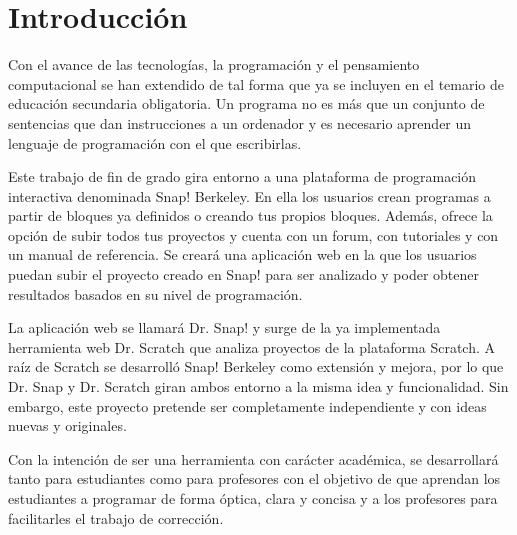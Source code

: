 \documentclass[a4paper, 12pt]{book}
\begin{document}
\tableofcontents 
\cleardoublepage
\listoffigures %



\cleardoublepage
\chapter{Introducción}
\label{sec:intro} %
Con el avance de las tecnologías, la programación y el pensamiento computacional se han extendido de tal forma que ya se incluyen en el temario de educación secundaria obligatoria. Un programa no es más que un conjunto de sentencias que dan instrucciones a un ordenador y es necesario aprender un lenguaje de programación con el que escribirlas.

Este trabajo de fin de grado gira entorno a una plataforma de programación interactiva denominada Snap! Berkeley. En ella los usuarios crean programas a partir de bloques ya definidos o creando tus propios bloques. Además, ofrece la opción de subir todos tus proyectos y cuenta con un forum, con tutoriales y con un manual de referencia. Se creará una aplicación web en la que los usuarios puedan subir el proyecto creado en Snap! para ser analizado y poder obtener resultados basados en su nivel de programación. 

La aplicación web se llamará Dr. Snap! y surge de la ya implementada herramienta web Dr. Scratch que analiza proyectos de la plataforma Scratch. A raíz de Scratch se desarrolló Snap! Berkeley como extensión y mejora, por lo que Dr. Snap y Dr. Scratch giran ambos entorno a la misma idea y funcionalidad. Sin embargo, este proyecto pretende ser completamente independiente y con ideas nuevas y originales.

Con la intención de ser una herramienta con carácter académica, se desarrollará tanto para estudiantes como para profesores con el objetivo de que aprendan los estudiantes a programar de forma óptica, clara y concisa y a los profesores para facilitarles el trabajo de corrección.
\end{document}

